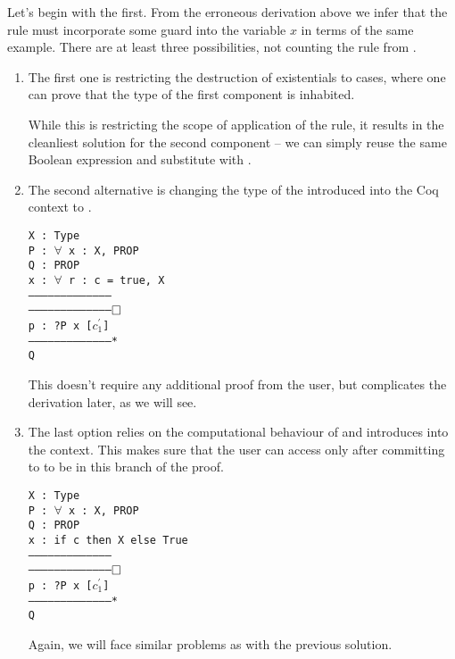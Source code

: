 Let's begin with the first.
From the erroneous derivation above we infer that the rule must incorporate some guard into the variable \(x\) in terms of the same example.
There are at least three possibilities, not counting the rule from \citet{harlandResourceDistributionBooleanConstraints2003}.
\begin{enumerate}
\item
  The first one is restricting the destruction of existentials to cases, where one can prove that the type of the first component is inhabited.

  While this is restricting the scope of application of the rule, it results in the cleanliest solution for the second component -- we can simply reuse the same Boolean expression and substitute  with .
\item The second alternative is changing the type of the  introduced into the Coq context to .

\begin{minipage}{\linewidth}
\texttt{X : Type\\
P : $\forall$ x : X, PROP\\
Q : PROP\\
x : $\forall$ r : c = true, X\\
---------------------------------------\\
---------------------------------------$\mathop{\Box}$\\
p : ?P x [$c^{'}_1$]\\
---------------------------------------*\\
Q
}
\end{minipage}
  This doesn't require any additional proof from the user, but complicates the derivation later, as we will see.
\item The last option relies on the computational behaviour of  and introduces  into the context.
  This makes sure that the user can access  only after committing to  to be \true in this branch of the proof.

\begin{minipage}{\linewidth}
\texttt{X : Type\\
P : $\forall$ x : X, PROP\\
Q : PROP\\
x : if c then X else True\\
---------------------------------------\\
---------------------------------------$\mathop{\Box}$\\
p : ?P x [$c^{'}_1$]\\
---------------------------------------*\\
Q
}
\end{minipage}
Again, we will face similar problems as with the previous solution.
\end{enumerate}


